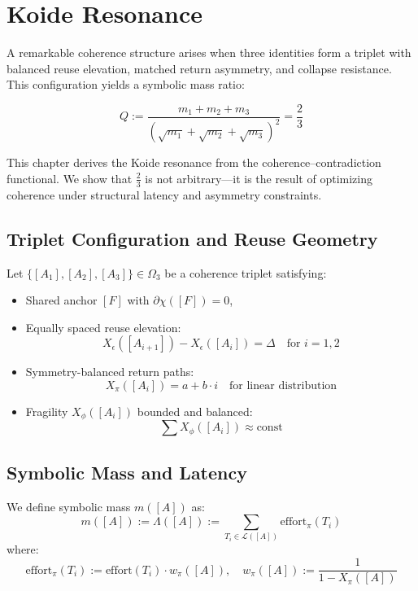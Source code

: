 \chapter{Koide Resonance} \label{chapter-koide}

A remarkable coherence structure arises when three identities form a triplet with balanced reuse elevation, matched return asymmetry, and collapse resistance. This configuration yields a symbolic mass ratio:

\[
Q := \frac{m_1 + m_2 + m_3}{\left( \sqrt{m_1} + \sqrt{m_2} + \sqrt{m_3} \right)^2} = \frac{2}{3}
\]

This chapter derives the Koide resonance from the coherence–contradiction functional. We show that $\frac{2}{3}$ is not arbitrary—it is the result of optimizing coherence under structural latency and asymmetry constraints.

\section{Triplet Configuration and Reuse Geometry} \label{sec:koide-geometry}

Let $\{[A_1], [A_2], [A_3]\} \in \Omega_3$ be a coherence triplet satisfying:

\begin{itemize}
  \item Shared anchor $[F]$ with $\partial\chi([F]) = 0$,
  \item Equally spaced reuse elevation:
    \[
    X_\epsilon([A_{i+1}]) - X_\epsilon([A_i]) = \Delta \quad \text{for } i=1,2
    \]
  \item Symmetry-balanced return paths:
    \[
    X_\pi([A_i]) = a + b \cdot i \quad \text{for linear distribution}
    \]
  \item Fragility $X_\phi([A_i])$ bounded and balanced:
    \[
    \sum X_\phi([A_i]) \approx \text{const}
    \]
\end{itemize}

\section{Symbolic Mass and Latency} \label{sec:koide-mass}

We define symbolic mass $m([A])$ as:
\begin{equation}
m([A]) := \Lambda([A]) := \sum_{T_i \in \mathcal{L}([A])} \text{effort}_\pi(T_i)
\end{equation}
where:
\begin{equation}
\text{effort}_\pi(T_i) := \text{effort}(T_i) \cdot w_\pi([A]), \quad w_\pi([A]) := \frac{1}{1 - X_\pi([A])}
\end{equation}


